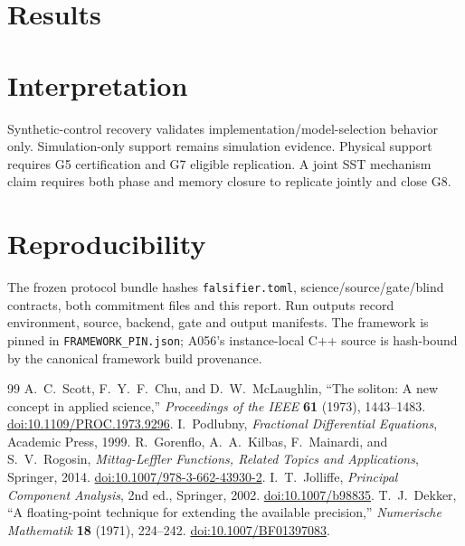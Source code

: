 \documentclass[11pt,a4paper]{article}
\newcommand{\code}[1]{\texttt{#1}}
\begin{document}
\section{Results}

\section{Interpretation}
Synthetic-control recovery validates implementation/model-selection behavior only. Simulation-only support remains simulation evidence. Physical support requires G5 certification and G7 eligible replication. A joint SST mechanism claim requires both phase and memory closure to replicate jointly and close G8.

\section{Reproducibility}
The frozen protocol bundle hashes \code{falsifier.toml}, science/source/gate/blind contracts, both commitment files and this report. Run outputs record environment, source, backend, gate and output manifests. The framework is pinned in \code{FRAMEWORK\_PIN.json}; A056's instance-local C++ source is hash-bound by the canonical framework build provenance.

\begin{thebibliography}{99}
 A.~C.~Scott, F.~Y.~F.~Chu, and D.~W.~McLaughlin, ``The soliton: A new concept in applied science,'' \emph{Proceedings of the IEEE} \textbf{61} (1973), 1443--1483. \href{https://doi.org/10.1109/PROC.1973.9296}{doi:10.1109/PROC.1973.9296}.
 I.~Podlubny, \emph{Fractional Differential Equations}, Academic Press, 1999.
 R.~Gorenflo, A.~A.~Kilbas, F.~Mainardi, and S.~V.~Rogosin, \emph{Mittag-Leffler Functions, Related Topics and Applications}, Springer, 2014. \href{https://doi.org/10.1007/978-3-662-43930-2}{doi:10.1007/978-3-662-43930-2}.
 I.~T.~Jolliffe, \emph{Principal Component Analysis}, 2nd ed., Springer, 2002. \href{https://doi.org/10.1007/b98835}{doi:10.1007/b98835}.
 T.~J.~Dekker, ``A floating-point technique for extending the available precision,'' \emph{Numerische Mathematik} \textbf{18} (1971), 224--242. \href{https://doi.org/10.1007/BF01397083}{doi:10.1007/BF01397083}.
\end{thebibliography}
\end{document}
